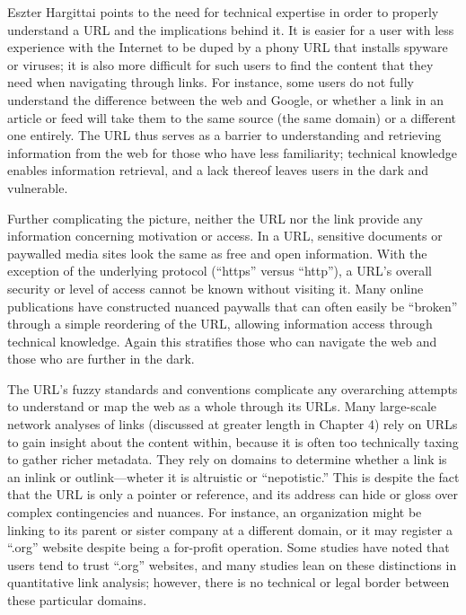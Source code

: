 Eszter Hargittai points to the need for technical expertise in order to properly understand a URL and the implications behind it.\autocite{hargittai} It is easier for a user with less experience with the Internet to be duped by a phony URL that installs spyware or viruses; it is also more difficult for such users to find the content that they need when navigating through links. For instance, some users do not fully understand the difference between the web and Google, or whether a link in an article or feed will take them to the same source (the same domain) or a different one entirely. The URL thus serves as a barrier to understanding and retrieving information from the web for those who have less familiarity; technical knowledge enables information retrieval, and a lack thereof leaves users in the dark and vulnerable.

Further complicating the picture, neither the URL nor the link provide any information concerning motivation or access. In a URL, sensitive documents or paywalled media sites look the same as free and open information. With the exception of the underlying protocol (``https'' versus ``http''), a URL's overall security or level of access cannot be known without visiting it. Many online publications have constructed nuanced paywalls that can often easily be ``broken'' through a simple reordering of the URL, allowing information access through technical knowledge. Again this stratifies those who can navigate the web and those who are further in the dark.

The URL's fuzzy standards and conventions complicate any overarching attempts to understand or map the web as a whole through its URLs. Many large-scale network analyses of links (discussed at greater length in Chapter 4) rely on URLs to gain insight about the content within, because it is often too technically taxing to gather richer metadata. They rely on domains to determine whether a link is an inlink or outlink---wheter it is altruistic or ``nepotistic.''\autocite{chakrabarti} This is despite the fact that the URL is only a pointer or reference, and its address can hide or gloss over complex contingencies and nuances. For instance, an organization might be linking to its parent or sister company at a different domain, or it may register a ``.org'' website despite being a for-profit operation. Some studies have noted that users tend to trust ``.org'' websites, and many studies lean on these distinctions in quantitative link analysis; however, there is no technical or legal border between these particular domains.\autocite{err find all this wherever I read it}

